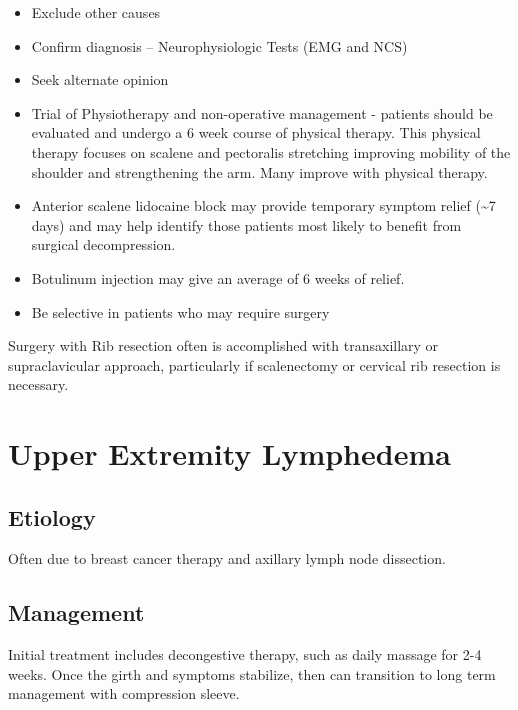 \documentclass[
]{book}
\begin{document}
\begin{itemize}
\item
  Exclude other causes
\item
  Confirm diagnosis -- Neurophysiologic Tests (EMG and NCS)
\item
  Seek alternate opinion
\item
  Trial of Physiotherapy and non-operative management - patients
  should be evaluated and undergo a 6 week course of physical therapy.
  This physical therapy focuses on scalene and pectoralis stretching
  improving mobility of the shoulder and strengthening the arm. Many
  improve with physical therapy.
  \citep{baldermanPhysicalTherapyManagement2019}
\item
  Anterior scalene lidocaine block may provide temporary symptom
  relief (\textasciitilde7 days) and may help identify those patients most likely
  to benefit from surgical decompression.
  \citep{salhanPC214UltrasoundGuidedAnesthetic2016, lumImpactAnteriorScalene2012}
\item
  Botulinum injection may give an average of 6 weeks of relief.
  \citep{salhanPC214UltrasoundGuidedAnesthetic2016}
\item
  Be selective in patients who may require surgery
\end{itemize}

Surgery with Rib resection often is accomplished with transaxillary or
supraclavicular approach, particularly if scalenectomy or cervical rib
resection is necessary.

\hypertarget{upper-extremity-lymphedema}{%
\section{Upper Extremity Lymphedema}\label{upper-extremity-lymphedema}}

\hypertarget{etiology-8}{%
\subsection{Etiology}\label{etiology-8}}

Often due to breast cancer therapy and axillary lymph node
dissection.\citep{morrell2005}

\hypertarget{management-14}{%
\subsection{Management}\label{management-14}}

Initial treatment includes decongestive therapy, such as daily massage
for 2-4 weeks. Once the girth and symptoms stabilize, then can
transition to long term management with compression sleeve.\citep{mondry2004}
\end{document}
